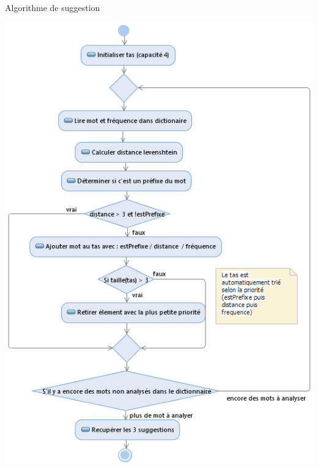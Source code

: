 \begin{frame}{Algorithme de suggestion}
	\vspace*{-0.75cm}
	\begin{center}

		\includegraphics[height=0.98\textheight]{images/uml_diapo.png}
	\end{center}

\end{frame}





